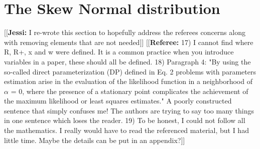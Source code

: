 \documentclass[11pt, oneside]{article}
\newcommand{\jessi}[1]{{\color{Purple}[[\textbf{Jessi: }#1]]}}
\newcommand{\comment}[1]{{\color{red}[[\textbf{Referee: }#1]]}}
\begin{document}
%

\section{The Skew Normal distribution} \label{sec:2}
\jessi{I re-wrote this section to hopefully address the referees concerns along with removing elements that are not needed}
\comment{17) I cannot find where R, R+, x and w were defined. It is a common practice when you introduce variables in a paper, these should all be defined.
18) Paragraph 4: "By using the so-called direct parameterization (DP) defined in Eq. 2 problems with parameters estimation arise in the evaluation of the likelihood function in a neighborhood of $\alpha$ = 0, where the presence of a stationary point complicates the achievement of the maximum likelihood or least squares estimates."
A poorly constructed sentence that simply confuses me! The authors are trying to say too many things in one sentence which loses the reader.
19) To be honest, I could not follow all the mathematics. I really would have to read the referenced material, but I had little time. Maybe the details can be put in an appendix?}
\end{document}
